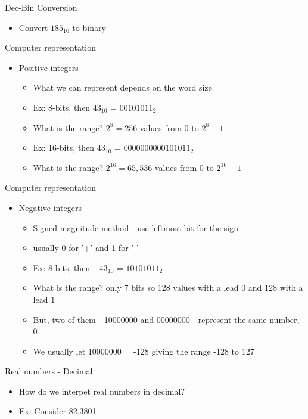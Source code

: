 \documentclass[12pt]{beamer}
\begin{document}
\begin{frame}{Dec-Bin Conversion}
\begin{itemize}
\item{Convert $185_{10}$ to binary}
\end{itemize}
\vspace{3 in}
\end{frame}

\begin{frame}{Computer representation}
\begin{itemize}
\item{Positive integers}
\begin{itemize}
\item{What we can represent depends on the word size}
\item{Ex: 8-bits, then $43_{10}$ = $00101011_{2}$}
\item{What is the range? $2^8=256$ values from 0 to $2^8 - 1$}
\item{Ex: 16-bits, then $43_{10}$ = $0000000000101011_{2}$}
\item{What is the range? $2^{16}=65,536$ values from 0 to $2^{16} - 1$}
\end{itemize}
\end{itemize}
\end{frame}

\begin{frame}{Computer representation}
\begin{itemize}
\item{Negative integers}
\begin{itemize}
\item{Signed magnitude method - use leftmost bit for the sign}
\item{usually 0 for '+' and 1 for '-'}
\item{Ex: 8-bits, then $-43_{10}$ = $10101011_{2}$}
\item{What is the range? only 7 bits so 128 values with a lead 0 and 128 with a lead 1}
\item{But, two of them - 10000000 and 00000000 - represent the same number, 0}
\item{We usually let 10000000 = -128 giving the range -128 to 127}
\end{itemize}
\end{itemize}
\end{frame}

\begin{frame}{Real numbers - Decimal}
\begin{itemize}
\item{How do we interpet real numbers in decimal?}
\item{Ex: Consider 82.3801}
\vspace{3 in}
\end{itemize}
\end{frame}
\end{document}
